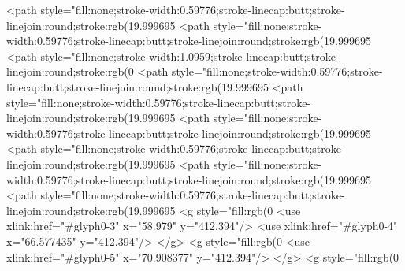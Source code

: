 <path style="fill:none;stroke-width:0.59776;stroke-linecap:butt;stroke-linejoin:round;stroke:rgb(19.999695%
<path style="fill:none;stroke-width:0.59776;stroke-linecap:butt;stroke-linejoin:round;stroke:rgb(19.999695%
<path style="fill:none;stroke-width:1.0959;stroke-linecap:butt;stroke-linejoin:round;stroke:rgb(0%
<path style="fill:none;stroke-width:0.59776;stroke-linecap:butt;stroke-linejoin:round;stroke:rgb(19.999695%
<path style="fill:none;stroke-width:0.59776;stroke-linecap:butt;stroke-linejoin:round;stroke:rgb(19.999695%
<path style="fill:none;stroke-width:0.59776;stroke-linecap:butt;stroke-linejoin:round;stroke:rgb(19.999695%
<path style="fill:none;stroke-width:0.59776;stroke-linecap:butt;stroke-linejoin:round;stroke:rgb(19.999695%
<path style="fill:none;stroke-width:0.59776;stroke-linecap:butt;stroke-linejoin:round;stroke:rgb(19.999695%
<path style="fill:none;stroke-width:0.59776;stroke-linecap:butt;stroke-linejoin:round;stroke:rgb(19.999695%
<g style="fill:rgb(0%
  <use xlink:href="#glyph0-3" x="58.979" y="412.394"/>
  <use xlink:href="#glyph0-4" x="66.577435" y="412.394"/>
</g>
<g style="fill:rgb(0%
  <use xlink:href="#glyph0-5" x="70.908377" y="412.394"/>
</g>
<g style="fill:rgb(0%
